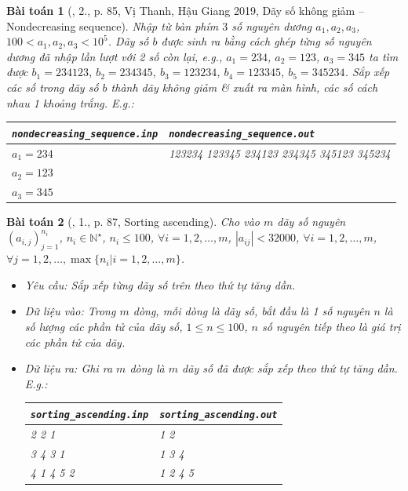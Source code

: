 \documentclass{article}
\newtheorem{baitoan}{Bài toán}
\begin{document}
\begin{baitoan}[\cite{VietSTEM2021}, 2., p. 85, Vị Thanh, Hậu Giang 2019, Dãy số không giảm -- Nondecreasing sequence]
	Nhập từ bàn phím $3$ số nguyên dương $a_1,a_2,a_3$, $100 < a_1,a_2,a_3 < 10^5$. Dãy số $b$ được sinh ra bằng cách ghép từng số nguyên dương đã nhập lần lượt với 2 số còn lại, e.g., $a_1 = 234$, $a_2 = 123$, $a_3 = 345$ ta tìm được $b_1 = 234123$, $b_2 = 234345$, $b_3 = 123234$, $b_4 = 123345$, $b_5 = 345234$. Sắp xếp các số trong dãy số $b$ thành dãy không giảm \& xuất ra màn hình, các số cách nhau 1 khoảng trắng. E.g.:
	\begin{table}[H]
		\centering
		\begin{tabular}{|l|l|}
			\hline
			\verb|nondecreasing_sequence.inp| & \verb|nondecreasing_sequence.out| \\
			\hline
			$a_1 = 234$  & 123234 123345 234123 234345 345123 345234 \\
			$a_2 = 123$ & \\
			$a_3 = 345$ & \\
			\hline
		\end{tabular}
	\end{table}
\end{baitoan}

\begin{baitoan}[\cite{VietSTEM2021}, 1., p. 87, Sorting ascending]
	Cho vào $m$ dãy số nguyên $(a_{i,j})_{j=1}^{n_i}$, $n_i\in\mathbb{N}^\star$, $n_i\le100$, $\forall i = 1,2,\ldots,m$, $|a_{ij}| < 32000$, $\forall i = 1,2,\ldots,m$, $\forall j = 1,2,\ldots,\max\{n_i|i = 1,2,\ldots,m\}$.
	\begin{itemize}
		\item {\sf Yêu cầu:} Sắp xếp từng dãy số trên theo thứ tự tăng dần.
		\item {\sf Dữ liệu vào:} Trong $m$ dòng, mỗi dòng là dãy số, bắt đầu là 1 số nguyên $n$ là số lượng các phần tử của dãy số, $1\le n\le100$, $n$ số nguyên tiếp theo là giá trị các phần tử của dãy.
		\item {\sf Dữ liệu ra:} Ghi ra $m$ dòng là $m$ dãy số đã được sắp xếp theo thứ tự tăng dần. E.g.:
		\begin{table}[H]
			\centering
			\begin{tabular}{|l|l|}
				\hline
				\verb|sorting_ascending.inp| & \verb|sorting_ascending.out| \\
				\hline
				2 2 1  & 1 2 \\
				3 4 3 1 & 1 3 4 \\
				4 1 4 5 2 & 1 2 4 5 \\
				\hline
			\end{tabular}
		\end{table}
	\end{itemize}
\end{baitoan}
\end{document}

